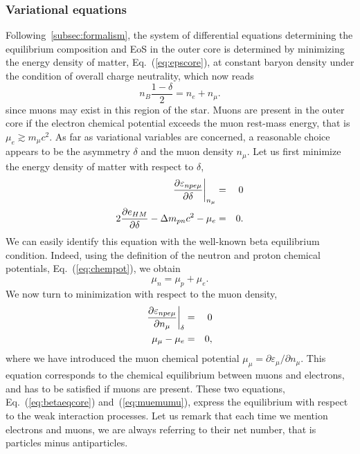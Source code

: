 \subsubsection{Variational equations}

Following~\ref{subsec:formalism}, the system of differential equations
determining the equilibrium composition and EoS in the outer core is
determined by minimizing the energy density of matter, Eq.~(\ref{eq:epscore}), 
at constant baryon density under the condition of overall charge neutrality, 
which now reads
%
\begin{equation}
  n_B\frac{1-\delta}{2} = n_e + n_{\mu}.\label{eq:chargecon}
\end{equation} 
%
since muons may exist in this region of the star. Muons are present in
the outer core if the electron chemical potential exceeds the muon rest-mass 
energy, that is $\mu_e \gtrsim m_\mu c^2$. 
As far as variational variables are concerned, a reasonable choice appears to
be the asymmetry $\delta$ and the muon density $n_{\mu}$. Let us first minimize
the energy density of matter with respect to $\delta$,
%
\begin{eqnarray}
  \frac{\partial \varepsilon_{npe\mu}}{\partial \delta}\bigg|_{n_\mu} &=&
  0\notag \\
  2\frac{\partial e_{HM}}{\partial \delta} - \Delta m_{pn}c^2 - \mu_e &=& 0.
\end{eqnarray}
%
We can easily identify this equation with the well-known beta equilibrium 
condition. Indeed, using the definition of the neutron and proton chemical 
potentials, Eq.~(\ref{eq:chempot}), we obtain
%
\begin{equation}
  \mu_n = \mu_p + \mu_e.\label{eq:betaeqcore}
\end{equation}
%
We now turn to minimization with respect to the muon density,
%
\begin{eqnarray}
  \frac{\partial \varepsilon_{npe\mu}}{\partial n_{\mu}}\bigg|_{\delta} &=&
  0\notag\\
  \mu_{\mu} - \mu_e &=& 0,\label{eq:muemumu}
\end{eqnarray}
%
where we have introduced the muon chemical potential $\mu_\mu = \partial
\varepsilon_\mu/\partial n_\mu$. This equation corresponds to the chemical 
equilibrium between muons and electrons, and has to be satisfied if muons are 
present. These two equations, Eq.~(\ref{eq:betaeqcore}) and~(\ref{eq:muemumu}), 
express the equilibrium with respect to the weak interaction processes. 
{Let us remark that each time we mention electrons and muons, we are always 
  referring to their net number, that is particles minus antiparticles.}

